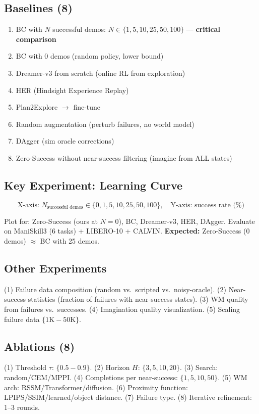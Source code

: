 \documentclass[11pt,a4paper]{article}
\begin{document}
\subsection{Baselines (8)}
\begin{enumerate}[nosep]
\item BC with $N$ successful demos: $N \in \{1, 5, 10, 25, 50, 100\}$ --- \textbf{critical comparison}
\item BC with 0 demos (random policy, lower bound)
\item Dreamer-v3 from scratch (online RL from exploration)
\item HER (Hindsight Experience Replay)
\item Plan2Explore $\to$ fine-tune
\item Random augmentation (perturb failures, no world model)
\item DAgger (sim oracle corrections)
\item Zero-Success without near-success filtering (imagine from ALL states)
\end{enumerate}

\subsection{Key Experiment: Learning Curve}
\begin{equation}
\text{X-axis: } N_{\text{successful demos}} \in \{0, 1, 5, 10, 25, 50, 100\}, \quad \text{Y-axis: success rate (\%)}
\end{equation}

Plot for: Zero-Success (ours at $N{=}0$), BC, Dreamer-v3, HER, DAgger. Evaluate on ManiSkill3 (6 tasks) + LIBERO-10 + CALVIN. \textbf{Expected:} Zero-Success (0 demos) $\approx$ BC with 25 demos.

\subsection{Other Experiments}
(1) Failure data composition (random vs.\ scripted vs.\ noisy-oracle). (2) Near-success statistics (fraction of failures with near-success states). (3) WM quality from failures vs.\ successes. (4) Imagination quality visualization. (5) Scaling failure data $\{1\text{K}{-}50\text{K}\}$.

\subsection{Ablations (8)}
(1) Threshold $\tau$: $\{0.5{-}0.9\}$. (2) Horizon $H$: $\{3,5,10,20\}$. (3) Search: random/CEM/MPPI. (4) Completions per near-success: $\{1,5,10,50\}$. (5) WM arch: RSSM/Transformer/diffusion. (6) Proximity function: LPIPS/SSIM/learned/object distance. (7) Failure type. (8) Iterative refinement: 1--3 rounds.
\end{document}
